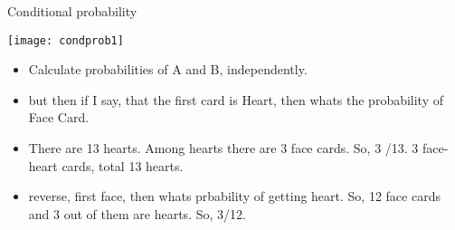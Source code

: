 \begin{frame}{Conditional probability }
\begin{center}
\texttt{[image: condprob1]}
\end{center}
\begin{itemize}
\item Calculate probabilities of A and B, independently.
\item but then if I say, that the first card is Heart, then whats the probability of Face Card.
\item There are 13 hearts. Among hearts there are 3 face cards. So, 3 /13. 3 face-heart cards, total 13 hearts.
\item reverse, first face, then whats prbability of getting heart. So, 12 face cards and 3 out of them are hearts. So, 3/12.
\end{itemize}
\end{frame}


